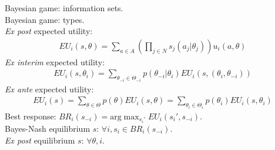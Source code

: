 \documentclass[paper=a4, fontsize=11pt]{scrartcl} %
\numberwithin{equation}{section} %
\numberwithin{figure}{section} %
\numberwithin{table}{section} %
\def \arg {\text{arg}}
\begin{document}
Bayesian game: information sets.\\
Bayesian game: types.\\
\textit{Ex post} expected utility:
\begin{align}
	EU_i(s,\theta) = \sum_{a\in A}(\prod_{j\in N}s_j(a_j|\theta_j)) u_i(a,\theta)
\end{align}
\textit{Ex interim} expected utility:
\begin{align}
	EU_i(s,\theta_i) = \sum_{\theta_{-i}\in \Theta_{-i}} p(\theta_{-i}|\theta_i) EU_i(s, (\theta_i, \theta_{-i}))
\end{align}
\textit{Ex ante} expected utility:
\begin{align}
	EU_i(s) = \sum_{\theta\in\Theta} p(\theta) EU_i(s,\theta) =\sum_{\theta_i\in\Theta_i} p(\theta_i) EU_i(s,\theta_i)
\end{align}
Best response: $BR_i(s_{-i})=\arg\max_{s_i'} EU_i(s_i',s_{-i})$.\\
Bayes-Nash equilibrium $s$: $\forall i, s_i\in BR_i(s_{-i})$.\\
\textit{Ex post} equilibrium $s$: $\forall\theta,i$.\\
\end{document}
